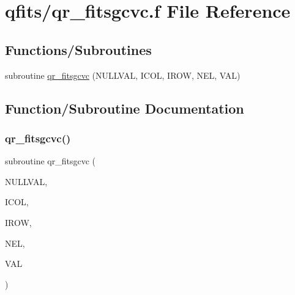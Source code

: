 \hypertarget{qr__fitsgcvc_8f}{}\section{qfits/qr\+\_\+fitsgcvc.f File Reference}
\label{qr__fitsgcvc_8f}
\subsection*{Functions/\+Subroutines}
\begin{DoxyCompactItemize}
\item 
subroutine \hyperlink{qr__fitsgcvc_8f_a432b913b5f004e581b01d1fc304430dc}{qr\+\_\+fitsgcvc} (N\+U\+L\+L\+V\+AL, I\+C\+OL, I\+R\+OW, N\+EL, V\+AL)
\end{DoxyCompactItemize}


\subsection{Function/\+Subroutine Documentation}
\mbox{\label{qr__fitsgcvc_8f_a432b913b5f004e581b01d1fc304430dc}} 
\subsubsection{\texorpdfstring{qr\+\_\+fitsgcvc()}{qr\_fitsgcvc()}}
{\footnotesize\ttfamily subroutine qr\+\_\+fitsgcvc (\begin{DoxyParamCaption}\item[{real}]{N\+U\+L\+L\+V\+AL,  }\item[{integer}]{I\+C\+OL,  }\item[{integer}]{I\+R\+OW,  }\item[{integer}]{N\+EL,  }\item[{complex, dimension(nel)}]{V\+AL }\end{DoxyParamCaption})}

